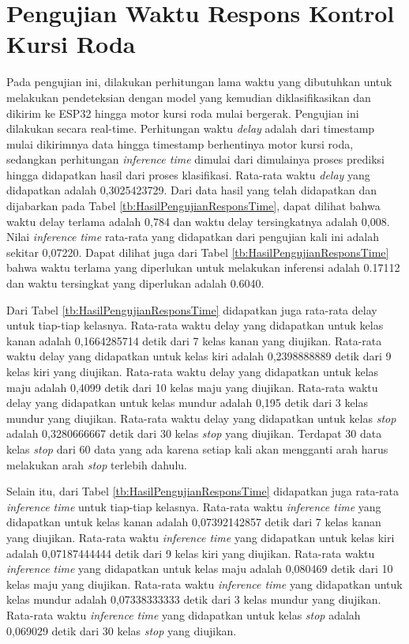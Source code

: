 \section{Pengujian Waktu Respons Kontrol Kursi Roda}
Pada pengujian ini, dilakukan perhitungan lama waktu yang dibutuhkan untuk melakukan pendeteksian dengan model yang kemudian diklasifikasikan dan dikirim ke ESP32 hingga motor kursi roda mulai bergerak. Pengujian ini dilakukan secara real-time. Perhitungan waktu \emph{delay} adalah dari timestamp mulai dikirimnya data hingga timestamp berhentinya motor kursi roda, sedangkan perhitungan \emph{inference time} dimulai dari dimulainya proses prediksi hingga didapatkan hasil dari proses klasifikasi. Rata-rata waktu \emph{delay} yang didapatkan adalah 0,3025423729. Dari data hasil yang telah didapatkan dan dijabarkan pada Tabel \ref{tb:HasilPengujianResponsTime}, dapat dilihat bahwa waktu delay terlama adalah 0,784 dan waktu delay tersingkatnya adalah 0,008. Nilai \emph{inference time} rata-rata yang didapatkan dari pengujian kali ini adalah sekitar 0,07220. Dapat dilihat juga dari Tabel \ref{tb:HasilPengujianResponsTime} bahwa waktu terlama yang diperlukan untuk melakukan inferensi adalah 0.17112 dan waktu tersingkat yang diperlukan adalah 0.6040. 

Dari Tabel \ref{tb:HasilPengujianResponsTime} didapatkan juga rata-rata delay untuk tiap-tiap kelasnya. Rata-rata waktu delay yang didapatkan untuk kelas kanan adalah 0,1664285714 detik dari 7 kelas kanan yang diujikan. Rata-rata waktu delay yang didapatkan untuk kelas kiri adalah 0,2398888889 detik dari 9 kelas kiri yang diujikan. Rata-rata waktu delay yang didapatkan untuk kelas maju adalah 0,4099 detik dari 10 kelas maju yang diujikan. Rata-rata waktu delay yang didapatkan untuk kelas mundur adalah 0,195 detik dari 3 kelas mundur yang diujikan. Rata-rata waktu delay yang didapatkan untuk kelas \emph{stop} adalah 0,3280666667 detik dari 30 kelas \emph{stop} yang diujikan. Terdapat 30 data kelas \emph{stop} dari 60 data yang ada karena setiap kali akan mengganti arah harus melakukan arah \emph{stop} terlebih dahulu.

Selain itu, dari Tabel \ref{tb:HasilPengujianResponsTime} didapatkan juga rata-rata \emph{inference time} untuk tiap-tiap kelasnya. Rata-rata waktu \emph{inference time} yang didapatkan untuk kelas kanan adalah 0,07392142857 detik dari 7 kelas kanan yang diujikan. Rata-rata waktu \emph{inference time} yang didapatkan untuk kelas kiri adalah 0,07187444444 detik dari 9 kelas kiri yang diujikan. Rata-rata waktu \emph{inference time} yang didapatkan untuk kelas maju adalah 0,080469 detik dari 10 kelas maju yang diujikan. Rata-rata waktu \emph{inference time} yang didapatkan untuk kelas mundur adalah 0,07338333333 detik dari 3 kelas mundur yang diujikan. Rata-rata waktu \emph{inference time} yang didapatkan untuk kelas \emph{stop} adalah 0,069029 detik dari 30 kelas \emph{stop} yang diujikan.


